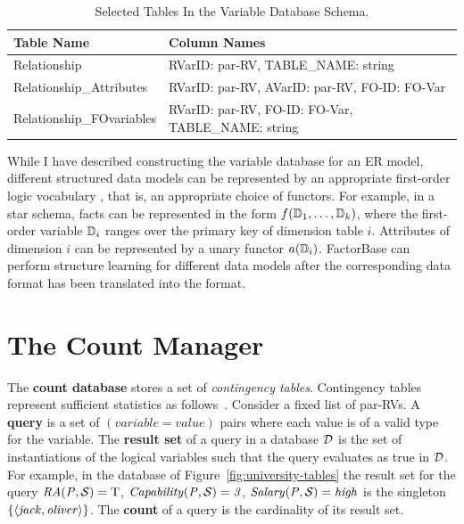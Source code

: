 \documentclass{sfuthesis}
\begin{document}
\begin{table}[hbtp]
\caption{Selected Tables In the Variable Database Schema.}
 \centering
\begin{tabular}{|l|p{10cm}|}
\hline
    {Table Name}&  {Column Names} \\\hline
{Relationship} & {RVarID: par-RV,  TABLE\_NAME: string} \\\hline
    {Relationship\_Attributes}&  {RVarID: par-RV, AVarID: par-RV,  FO-ID: FO-Var} \\\hline
    {Relationship\_FOvariables} & {RVarID: par-RV, FO-ID: FO-Var,  TABLE\_NAME: string}\\\hline
        \end{tabular}%
 \label{table:vdb-schema}
\end{table}


While I  have described constructing the variable database for an ER model, different structured data models can be represented by an appropriate first-order logic vocabulary \cite{Kimmig2015}, that is, an appropriate choice of functors. For example, in a star schema, facts can be represented in the form $\functor(\dimension_{1},\ldots,\dimension_{k})$, where the first-order variable $\dimension_{i}$ ranges over the primary key of dimension table $i$. Attributes of dimension $i$ can be represented by a unary functor $\attribute(\dimension_{i})$. FactorBase can perform structure learning for different data models after the corresponding data format has been translated into the \RVD format.


\section{The Count Manager} \label{sec:count}
The \textbf{count database} \CDB stores a set of  {\em contingency tables}. Contingency tables represent sufficient statistics as follows~\cite{Moore1998, Qian2014a}. 
Consider a fixed list of par-RVs.
A \textbf{query} is a set of $(variable = value)$ pairs where each value is of a valid type for the variable. 
The \textbf{result set} of a query in a database $\D$ is the set of instantiations of the logical variables such that the query evaluates as true in $\D$.
For example, in the database of Figure~\ref{fig:university-tables} the result set for the query 
$\it{RA}(\P,\S) = \true$, $\it{Capability}(\P,\S) = 3$, $\it{Salary}(\P,\S) = \it{high} $ is
the singleton $\{\langle \it{jack}, \it{oliver}\rangle\}$. 
The \textbf{count} of a query is the cardinality of its result set. 
\end{document}
